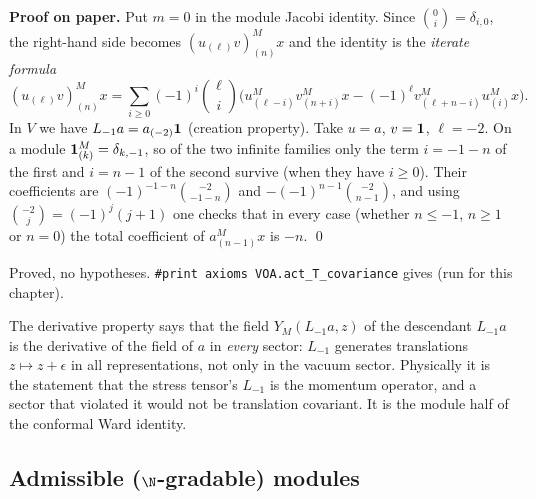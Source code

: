 \textbf{Proof on paper.} Put $m=0$ in the module Jacobi identity. Since $\binom0i = \delta_{i,0}$, the
right-hand side becomes $(u_{(\ell)}v)^M_{(n)}x$ and the identity is the \emph{iterate formula}
\begin{equation*}
 (u_{(\ell)}v)^M_{(n)}x = \sum_{i\ge0}(-1)^i\binom\ell i\Big(u^M_{(\ell-i)}v^M_{(n+i)}x - (-1)^\ell v^M_{(\ell+n-i)}u^M_{(i)}x\Big).
\end{equation*}
In $V$ we have $L_{-1}a = a_{(-2)}\mathbf{1}$ (creation property). Take $u = a$, $v=\mathbf{1}$,
$\ell = -2$. On a module $\mathbf{1}^M_{(k)} = \delta_{k,-1}$, so of the two infinite families only the
term $i = -1-n$ of the first and $i = n-1$ of the second survive (when they have $i\ge0$). Their
coefficients are $(-1)^{-1-n}\binom{-2}{-1-n}$ and $-(-1)^{n-1}\binom{-2}{n-1}$, and using
$\binom{-2}{j} = (-1)^j(j+1)$ one checks that in every case (whether $n\le-1$, $n\ge1$ or $n=0$) the total
coefficient of $a^M_{(n-1)}x$ is $-n$. \qed

\begin{status}
Proved, no hypotheses. \texttt{\#print axioms VOA.act\_T\_covariance} gives
 (run for this chapter).
\end{status}

\begin{physics}
The derivative property says that the field $Y_M(L_{-1}a,z)$ of the descendant $L_{-1}a$ is the derivative of the
field of $a$ in \emph{every} sector: $L_{-1}$ generates translations $z\mapsto z+\epsilon$ in all
representations, not only in the vacuum sector. Physically it is the statement that the stress tensor's
$L_{-1}$ is the momentum operator, and a sector that violated it would not be translation covariant. It is
the module half of the conformal Ward identity.
\end{physics}

\subsection{Admissible (\texorpdfstring{$\N$}{N}-gradable) modules}

